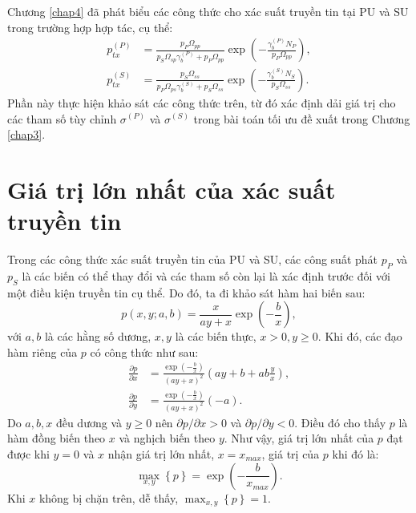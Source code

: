 \documentclass[../main.tex]{subfiles}
\begin{document}
\label{appendixC}

Chương \ref{chap4} đã phát biểu các công thức cho xác suất truyền tin tại PU và SU trong trường hợp hợp tác, cụ thể:
\begin{subequations}\label{proofC:ptx}
\begin{align}
p_{tx}^{(P)} 
    &= \frac{p_P\Omega_{pp}}{p_S\Omega_{sp}\gamma_b^{(P)} + p_P\Omega_{pp}}\exp\left(-\frac{\gamma_b^{(P)}N_P}{p_P\Omega_{pp}}\right), \label{proofC:ptxp} \\
p_{tx}^{(S)} 
    &= \frac{p_S\Omega_{ss}}{p_P\Omega_{ps}\gamma_b^{(S)} + p_S\Omega_{ss}}\exp\left(-\frac{\gamma_b^{(S)}N_S}{p_S\Omega_{ss}}\right).\label{proofC:ptxs}
\end{align}
\end{subequations}
Phần này thực hiện khảo sát các công thức trên, từ đó xác định dải giá trị cho các tham số tùy chỉnh $\sigma^{(P)}$ và $\sigma^{(S)}$ trong bài toán tối ưu đề xuất trong Chương \ref{chap3}.

\section{Giá trị lớn nhất của xác suất truyền tin}

Trong các công thức xác suất truyền tin của PU và SU, các công suất phát $p_P$ và $p_S$ là các biến có thể thay đổi và các tham số còn lại là xác định trước đối với một điều kiện truyền tin cụ thể. Do đó, ta đi khảo sát hàm hai biến sau:
\begin{equation}\label{fptx}
    p\left(x, y; a, b\right) = \frac{x}{ay+x}\exp\left(-\frac{b}{x}\right),
\end{equation}
với $a, b$ là các hằng số dương, $x, y$ là các biến thực, $x > 0, y \geq 0$. Khi đó, các đạo hàm riêng của $p$ có công thức như sau:
\begin{subequations}
\begin{align}
\frac{\partial{p}}{\partial{x}} &= \frac{\exp\left(-\frac{b}{x}\right)}{\left(ay+x\right)^2}\left(ay + b + ab\frac{y}{x}\right),  \\
\frac{\partial{p}}{\partial{y}} &= \frac{\exp\left(-\frac{b}{x}\right)}{\left(ay+x\right)^2}\left(-a\right).
\end{align}
\end{subequations}
Do $a, b, x$ đều dương và $y \geq 0$ nên ${\partial{p}}/{\partial{x}} > 0$ và ${\partial{p}}/{\partial{y}} < 0$. Điều đó cho thấy $p$ là hàm đồng biến theo $x$ và nghịch biến theo $y$. Như vậy, giá trị lớn nhất của $p$ đạt được khi $y = 0$ và $x$ nhận giá trị lớn nhất, $x = x_{max}$, giá trị của $p$ khi đó là:
\begin{equation*}
    \max_{x,y}\left\{p\right\} = \exp\left(-\frac{b}{x_{max}}\right).
\end{equation*}
Khi $x$ không bị chặn trên, dễ thấy, $\max_{x,y}\left\{p\right\} = 1$.
\end{document}
